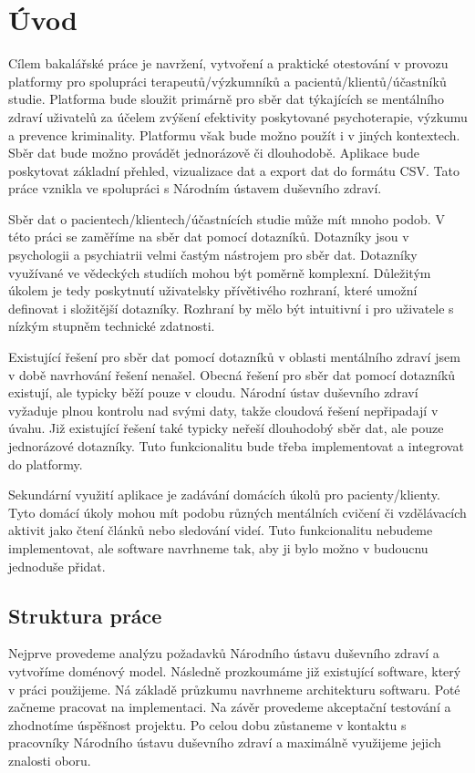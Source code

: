 \chapter*{Úvod}

Cílem bakalářské práce je navržení, vytvoření a praktické otestování v provozu platformy pro spolupráci terapeutů/výzkumníků a pacientů/klientů/účastníků studie.
Platforma bude sloužit primárně pro sběr dat týkajících se mentálního zdraví uživatelů za účelem zvýšení efektivity poskytované psychoterapie, výzkumu a prevence kriminality.
Platformu však bude možno použít i v jiných kontextech.
Sběr dat bude možno provádět jednorázově či dlouhodobě.
Aplikace bude poskytovat základní přehled, vizualizace dat a export dat do formátu CSV.
Tato práce vznikla ve spolupráci s Národním ústavem duševního zdraví.

Sběr dat o pacientech/klientech/účastnících studie může mít mnoho podob.
V této práci se zaměříme na sběr dat pomocí dotazníků. 
Dotazníky jsou v psychologii a psychiatrii velmi častým nástrojem pro sběr dat. 
Dotazníky využívané ve vědeckých studiích mohou být poměrně komplexní.
Důležitým úkolem je tedy poskytnutí uživatelsky přívětivého rozhraní, které umožní definovat i složitější dotazníky.
Rozhraní by mělo být intuitivní i pro uživatele s nízkým stupněm technické zdatnosti.

Existující řešení pro sběr dat pomocí dotazníků v oblasti mentálního zdraví jsem v době navrhování řešení nenašel. 
Obecná řešení pro sběr dat pomocí dotazníků existují, ale typicky běží pouze v cloudu. 
Národní ústav duševního zdraví vyžaduje plnou kontrolu nad svými daty, takže cloudová řešení nepřipadají v úvahu. 
Již existující řešení také typicky neřeší dlouhodobý sběr dat, ale pouze jednorázové dotazníky. 
Tuto funkcionalitu bude třeba implementovat a integrovat do platformy.

Sekundární využití aplikace je zadávání domácích úkolů pro pacienty/klienty.
Tyto domácí úkoly mohou mít podobu různých mentálních cvičení či vzdělávacích aktivit jako čtení článků nebo sledování videí.
Tuto funkcionalitu nebudeme implementovat, ale software navrhneme tak, aby ji bylo možno v budoucnu jednoduše přidat.

\section*{Struktura práce}\label{sec:struktura-prace}

Nejprve provedeme analýzu požadavků Národního ústavu duševního zdraví a vytvoříme doménový model. 
Následně prozkoumáme již existující software, který v práci použijeme. 
Ná základě průzkumu navrhneme architekturu softwaru.
Poté začneme pracovat na implementaci. 
Na závěr provedeme akceptační testování a zhodnotíme úspěšnost projektu. 
Po celou dobu zůstaneme v kontaktu s pracovníky Národního ústavu duševního zdraví a maximálně využijeme jejich znalosti oboru.